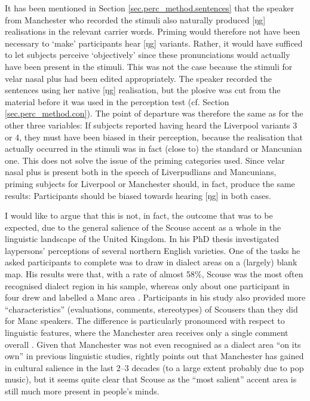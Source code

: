 It has been mentioned in Section \ref{sec.perc_method.sentences} that the speaker from Manchester who recorded the stimuli also naturally produced [ŋg] realisations in the relevant carrier words.
Priming would therefore not have been necessary to `make' participants hear [ŋg] variants.
Rather, it would have sufficed to let subjects perceive `objectively' since these pronunciations would actually have been present in the stimuli.
This was not the case because the stimuli for velar nasal plus had been edited appropriately.
The speaker recorded the sentences using her native [ŋg] realisation, but the plosive was cut from the material before it was used in the perception test (cf. Section \ref{sec.perc_method.con}).
The point of departure was therefore the same as for the other three variables: If subjects reported having heard the Liverpool variants 3 or 4, they must have been biased in their perception, because the realisation that actually occurred in the stimuli was in fact (close to) the standard or Mancunian one.
This does not solve the issue of the priming categories used.
Since velar nasal plus is present both in the speech of Liverpudlians and Mancunians, priming subjects for Liverpool or Manchester should, in fact, produce the same results: Participants should be biased towards hearing [ŋg] in both cases.

I would like to argue that this is not, in fact, the outcome that was to be expected, due to the general salience of the Scouse accent as a whole in the linguistic landscape of the United Kingdom.
In his \citeyear{montgomery2007} PhD thesis \citeauthor{montgomery2007} investigated laypersons' perceptions of several northern English varieties.
One of the tasks he asked participants to complete was to draw in dialect areas on a (largely) blank map.
His results were that, with a rate of almost 58\%, Scouse was the most often recognised dialect region in his sample, whereas only about one participant in four drew and labelled a Manc area \parencite[cf.][194]{montgomery2007}.
Participants in his study also provided more ``characteristics'' (evaluations, comments, stereotypes) of Scousers than they did for Manc speakers.
The difference is particularly pronounced with respect to linguistic features, where the Manchester area receives only a single comment overall \parencite[cf.][246--252]{montgomery2007}.
Given that Manchester was not even recognised as a dialect area ``on its own'' in previous linguistic studies, \textcite[cf.][214--215]{montgomery2007} rightly points out that Manchester has gained in cultural salience in the last 2--3 decades (to a large extent probably due to pop music), but it seems quite clear that Scouse as the ``most salient'' \parencite[216]{montgomery2007} accent area is still much more present in people's minds.


